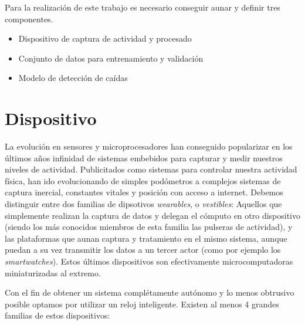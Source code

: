 \documentclass[../tfm.tex]{subfiles}
\begin{document}

Para la realización de este trabajo es necesario conseguir aunar y definir tres componentes.
\begin{itemize}
  \item Dispositivo de captura de actividad y procesado
  \item Conjunto de datos para entrenamiento y validación
  \item Modelo de detección de caídas
\end{itemize}

\section{Dispositivo}\label{req_hardware}

La evolución en sensores y microprocesadores han conseguido popularizar en los últimos años infinidad de sistemas embebidos para capturar y medir nuestros niveles de actividad. Publicitados como sistemas para controlar nuestra actividad física, han ido evolucionando de simples podómetros a complejos sistemas de captura inercial, constantes vitales y posición con acceso a internet. Debemos distinguir entre dos familias de dipsotivos \textit{wearables}, o \textit{vestibles}: Aquellos que simplemente realizan la captura de datos y delegan el cómputo en otro dispositivo (siendo los más conocidos miembros de esta familia las pulseras de actividad), y las plataformas que aunan captura y tratamiento en el mismo sistema, aunque puedan a su vez transmitir los datos a un tercer actor (como por ejemplo los \textit{smartwatches}). Estos últimos dispositivos son efectivamente microcomputadoras miniaturizadas al extremo.

Con el fin de obtener un sistema complétamente autónomo y lo menos obtrusivo posible  optamos por utilizar un reloj inteligente. Existen al menos 4 grandes familias de estos dispositivos:

\end{document}
